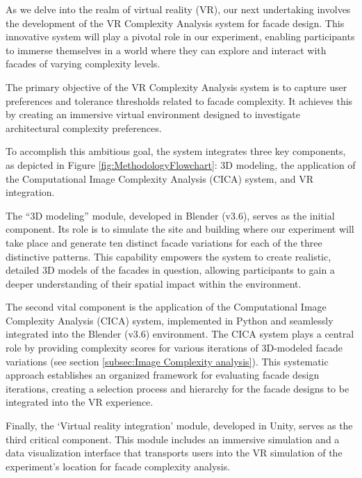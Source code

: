 
As we delve into the realm of virtual reality (VR), our next undertaking involves the development of the VR Complexity Analysis system for facade design.
This innovative system will play a pivotal role in our experiment, enabling participants to immerse themselves in a world where they can explore and interact with facades of varying complexity levels.

The primary objective of the VR Complexity Analysis system is to capture user preferences and tolerance thresholds related to facade complexity.
It achieves this by creating an immersive virtual environment designed to investigate architectural complexity preferences.

To accomplish this ambitious goal, the system integrates three key components, as depicted in Figure \ref{fig:MethodologyFlowchart}: 3D modeling, the application of the Computational Image Complexity Analysis (CICA) system, and VR integration.

The ``3D modeling'' module, developed in Blender (v3.6), serves as the initial component.
Its role is to simulate the site and building where our experiment will take place and generate ten distinct facade variations for each of the three distinctive patterns.
This capability empowers the system to create realistic, detailed 3D models of the facades in question, allowing participants to gain a deeper understanding of their spatial impact within the environment.

The second vital component is the application of the Computational Image Complexity Analysis (CICA) system, implemented in Python and seamlessly integrated into the Blender (v3.6) environment.
The CICA system plays a central role by providing complexity scores for various iterations of 3D-modeled facade variations (see section \ref{subsec:Image Complexity analysis}).
This systematic approach establishes an organized framework for evaluating facade design iterations, creating a selection process and hierarchy for the facade designs to be integrated into the VR experience.

Finally, the `Virtual reality integration' module, developed in Unity, serves as the third critical component.
This module includes an immersive simulation and a data visualization interface that transports users into the VR simulation of the experiment's location for facade complexity analysis.

